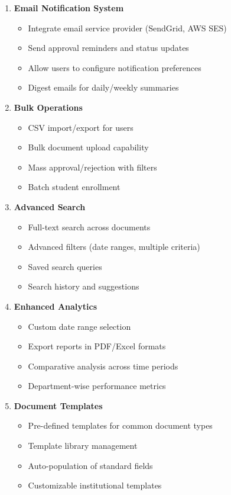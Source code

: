 \begin{enumerate}
\item \textbf{Email Notification System}
\begin{itemize}
\item Integrate email service provider (SendGrid, AWS SES)
\item Send approval reminders and status updates
\item Allow users to configure notification preferences
\item Digest emails for daily/weekly summaries
\end{itemize}

\item \textbf{Bulk Operations}
\begin{itemize}
\item CSV import/export for users
\item Bulk document upload capability
\item Mass approval/rejection with filters
\item Batch student enrollment
\end{itemize}

\item \textbf{Advanced Search}
\begin{itemize}
\item Full-text search across documents
\item Advanced filters (date ranges, multiple criteria)
\item Saved search queries
\item Search history and suggestions
\end{itemize}

\item \textbf{Enhanced Analytics}
\begin{itemize}
\item Custom date range selection
\item Export reports in PDF/Excel formats
\item Comparative analysis across time periods
\item Department-wise performance metrics
\end{itemize}

\item \textbf{Document Templates}
\begin{itemize}
\item Pre-defined templates for common document types
\item Template library management
\item Auto-population of standard fields
\item Customizable institutional templates
\end{itemize}
\end{enumerate}

